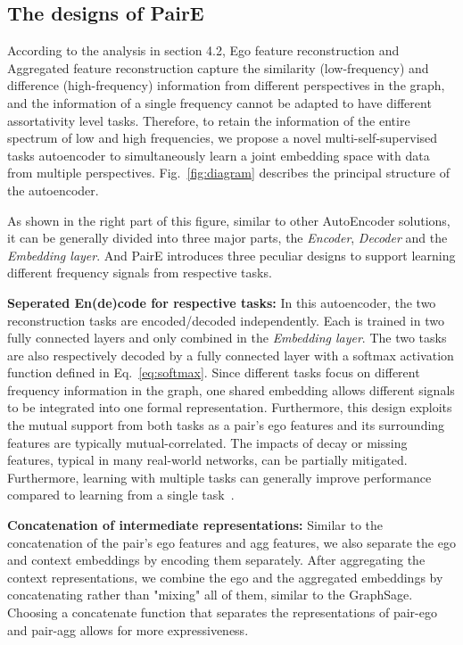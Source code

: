 \documentclass[10pt,journal,compsoc]{IEEEtran}
\begin{document}
\subsection{The designs of PairE}

    
According to the analysis in section 4.2, Ego feature reconstruction and Aggregated feature reconstruction capture the similarity (low-frequency) and difference (high-frequency) information from different perspectives in the graph, and the information of a single frequency cannot be adapted to have different assortativity level tasks. Therefore, to retain the information of the entire spectrum of low and high frequencies, we propose a novel multi-self-supervised tasks autoencoder to simultaneously learn a joint embedding space with data from multiple perspectives. Fig.~\ref{fig:diagram} describes the principal structure of the autoencoder. 
 
As shown in the right part of this figure, similar to other AutoEncoder solutions, it can be generally divided into three major parts, the \textit{Encoder}, \textit{Decoder} and the \textit{Embedding layer}. And PairE introduces three peculiar designs to support learning different frequency signals from respective tasks. 


\noindent\textbf{Seperated En(de)code for respective tasks: } In this autoencoder, the two reconstruction tasks are encoded/decoded independently. Each is trained in two fully connected layers and only combined in the \textit{Embedding layer}. The two tasks are also respectively decoded by a fully connected layer with a softmax activation function defined in Eq.~\ref{eq:softmax}. Since different tasks focus on different frequency information in the graph, one shared embedding allows different signals to be integrated into one formal representation. Furthermore, this design exploits the mutual support from both tasks as a pair's ego features and its surrounding features are typically mutual-correlated. The impacts of decay or missing features, typical in many real-world networks, can be partially mitigated. Furthermore, learning with multiple tasks can generally improve performance compared to learning from a single task~\cite{Zhang17}. 

\noindent\textbf{Concatenation of intermediate representations: } Similar to the concatenation of the pair's ego features and agg features, we also separate the ego and context embeddings by encoding them separately. After aggregating the context representations, we combine the ego and the aggregated embeddings by concatenating rather than "mixing" all of them, similar to the GraphSage\cite{hamilton_grapshsage}. Choosing a concatenate function that separates the representations of pair-ego and pair-agg allows for more expressiveness\cite{Zhu2020}.
    
\end{document}
